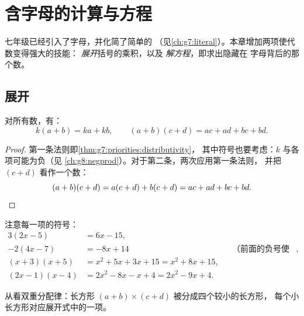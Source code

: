 \chapter{含字母的计算与方程}\label{ch:g8:equations}

七年级已经引入了字母，并化简了简单的
（见\cref{ch:g7:literal}）。本章增加两项使代数变得强大的技能：
\emph{展开}括号的乘积，以及
\emph{解方程}，即求出隐藏在
字母背后的那个数。

\section{展开}

\begin{theorem}[单分配律与双分配律]\label{thm:g8:equations:expand}
对所有数，有：
\[
k(a + b) = ka + kb,
\qquad
(a + b)(c + d) = ac + ad + bc + bd .
\]
\end{theorem}

\begin{proof}
第一条法则即\cref{thm:g7:priorities:distributivity}，
其中符号也要考虑：$k$ 与各项可能为负（见
\cref{ch:g8:negprod}）。对于第二条，两次应用第一条法则，
并把 $(c + d)$ 看作一个数：
\[
(a + b)(c + d) = a(c + d) + b(c + d) = ac + ad + bc + bd .
\qedhere
\]
\end{proof}

\begin{example}\label{ex:g8:equations:expand}
注意每一项的符号：
\begin{align*}
3(2x - 5) &= 6x - 15, \\
-2(4x - 7) &= -8x + 14
&& \text{（前面的负号使两项的符号都改变）}, \\
(x + 3)(x + 5) &= x^2 + 5x + 3x + 15 = x^2 + 8x + 15, \\
(2x - 1)(x - 4) &= 2x^2 - 8x - x + 4 = 2x^2 - 9x + 4 .
\end{align*}
\end{example}

\begin{omfigure}

{\small 从看双重分配律：长方形
$(a+b) \times (c+d)$ 被分成四个较小的长方形，
每个小长方形对应展开式中的一项。}
\end{omfigure}

